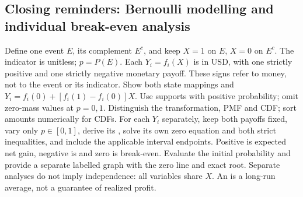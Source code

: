 \subsection*{Closing reminders: Bernoulli modelling and individual break-even analysis}
Define one event $E$, its complement $E^c$, and keep $X=1$ on $E$, $X=0$ on $E^c$.
The indicator is unitless; $p=P(E)$. Each $Y_i=f_i(X)$ is in USD, with one
strictly positive and one strictly negative monetary payoff. These signs refer
to money, not to the event or its indicator. Show both state mappings and
$Y_i=f_i(0)+[f_i(1)-f_i(0)]X$.
Use supports with positive probability; omit zero-mass values at $p=0,1$.
Distinguish the transformation, PMF and CDF; sort amounts numerically for CDFs.
For each $Y_i$ separately, keep both payoffs fixed, vary only $p\in[0,1]$,
derive its , solve its own zero equation and both strict inequalities,
and include the applicable interval endpoints. Positive  is expected
net gain, negative is  and zero is break-even. Evaluate the initial
probability and provide a separate labelled graph with the zero line and exact root.
Separate analyses do not imply independence: all variables share $X$.
An  is a long-run average, not a guarantee of realized profit.

